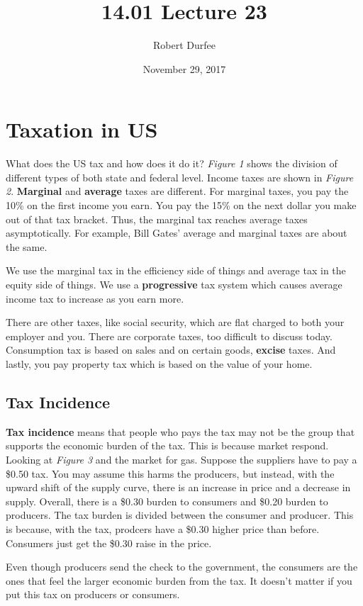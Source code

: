 \documentclass{article}
\title{ 14.01 Lecture 23 }
\author{ Robert Durfee }
\date{ November 29, 2017 }
\begin{document}
\maketitle

\section{ Taxation in US }

What does the US tax and how does it do it? \textit{Figure 1} shows the division
of different types of both state and federal level. Income taxes are shown in
\textit{Figure 2}. \textbf{Marginal} and \textbf{average} taxes are different.
For marginal taxes, you pay the 10\% on the first income you earn. You pay the
15\% on the next dollar you make out of that tax bracket. Thus, the marginal tax
reaches average taxes asymptotically. For example, Bill Gates' average and
marginal taxes are about the same. 

We use the marginal tax in the efficiency side of things and average tax in the
equity side of things. We use a \textbf{progressive} tax system which causes
average income tax to increase as you earn more.

There are other taxes, like social security, which are flat charged to both your
employer and you. There are corporate taxes, too difficult to discuss today.
Consumption tax is based on sales and on certain goods, \textbf{excise} taxes.
And lastly, you pay property tax which is based on the value of your home. 

\subsection{ Tax Incidence }

\textbf{Tax incidence} means that people who pays the tax may not be the group
that supports the economic burden of the tax. This is because market respond.
Looking at \textit{Figure 3} and the market for gas. Suppose the suppliers have
to pay a \$0.50 tax. You may assume this harms the producers, but instead, with
the upward shift of the supply curve, there is an increase in price and a
decrease in supply. Overall, there is a \$0.30 burden to consumers and \$0.20
burden to producers. The tax burden is divided between the consumer and
producer. This is because, with the tax, prodcers have a \$0.30 higher price
than before. Consumers just get the \$0.30 raise in the price. 

Even though producers send the check to the government, the consumers are the
ones that feel the larger economic burden from the tax. It doesn't matter if you
put this tax on producers or consumers. 
\end{document}
